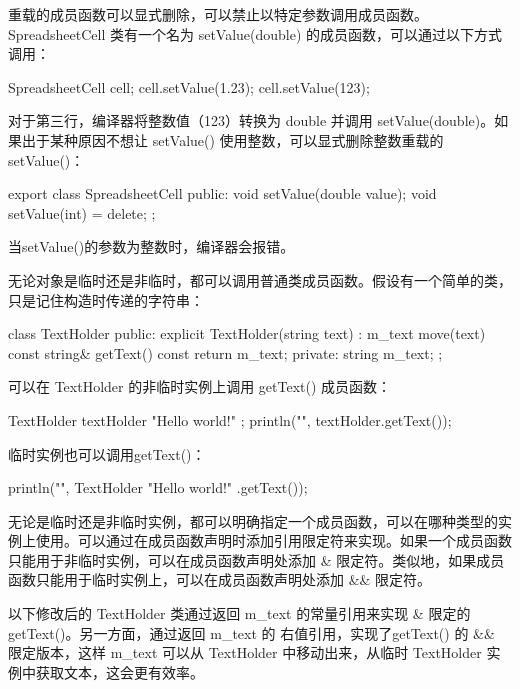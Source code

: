 
重载的成员函数可以显式删除，可以禁止以特定参数调用成员函数。SpreadsheetCell 类有一个名为 setValue(double) 的成员函数，可以通过以下方式调用：

\begin{cpp}
SpreadsheetCell cell;
cell.setValue(1.23);
cell.setValue(123);
\end{cpp}

对于第三行，编译器将整数值（123）转换为 double 并调用 setValue(double)。如果出于某种原因不想让 setValue() 使用整数，可以显式删除整数重载的 setValue()：

\begin{cpp}
export class SpreadsheetCell
{
    public:
        void setValue(double value);
        void setValue(int) = delete;
};
\end{cpp}

当setValue()的参数为整数时，编译器会报错。


无论对象是临时还是非临时，都可以调用普通类成员函数。假设有一个简单的类，只是记住构造时传递的字符串：

\begin{cpp}
class TextHolder
{
    public:
        explicit TextHolder(string text) : m_text { move(text) } {}
        const string& getText() const { return m_text; }
    private:
        string m_text;
};
\end{cpp}

可以在 TextHolder 的非临时实例上调用 getText() 成员函数：

\begin{cpp}
TextHolder textHolder { "Hello world!" };
println("{}", textHolder.getText());
\end{cpp}

临时实例也可以调用getText()：

\begin{cpp}
println("{}", TextHolder{ "Hello world!" }.getText());
\end{cpp}

无论是临时还是非临时实例，都可以明确指定一个成员函数，可以在哪种类型的实例上使用。可以通过在成员函数声明时添加引用限定符来实现。如果一个成员函数只能用于非临时实例，可以在成员函数声明处添加 \& 限定符。类似地，如果成员函数只能用于临时实例上，可以在成员函数声明处添加 \&\& 限定符。

以下修改后的 TextHolder 类通过返回 m\_text 的常量引用来实现 \& 限定的 getText()。另一方面，通过返回 m\_text 的 右值引用，实现了getText() 的 \&\& 限定版本，这样 m\_text 可以从 TextHolder 中移动出来，从临时 TextHolder 实例中获取文本，这会更有效率。

